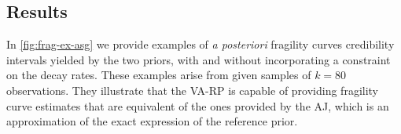 \subsection{Results}\label{sec:constr-frags:subsec:results}






In \cref{fig:frag-ex-asg} we provide examples of \emph{a posteriori} fragility curves credibility intervals yielded by the two priors, with and without incorporating a constraint on the decay rates.
These examples arise from given samples of $k=80$ observations. They illustrate that the VA-RP is capable of providing fragility curve estimates that are equivalent of the ones provided by the AJ, which is an approximation of the exact expression of the reference prior.


